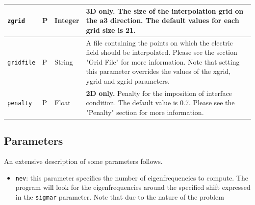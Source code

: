 \documentclass[11pt,a4paper,oneside]{article}
\begin{document}
\begin{center}
\begin{tabular}{| l | l | l | p{230pt} |}
	{\tt zgrid} & P & Integer & {\bf 3D only.} The size of the interpolation grid on the a3 direction. The default values for each grid size is 21. \\ \hline
	{\tt gridfile} & P & String & A file containing the points on which the electric field should be interpolated. Please see the section "Grid File" for more information. Note that setting this parameter overrides the values of the xgrid, ygrid and zgrid parameters. \\ \hline
	{\tt penalty} & P & Float & {\bf 2D only.} Penalty for the imposition of interface condition. The default value is 0.7. Please see the "Penalty" section for more information. \\ \hline
    \hline
  \end{tabular}
\end{center}

\newpage

\subsection{Parameters}
An extensive description of some parameters follows.
\begin{itemize}
\item {\tt nev}: this parameter specifies the number of eigenfrequencies to compute. The program will look for the eigenfrequencies around the specified shift expressed in the {\tt sigmar} parameter. Note that due to the nature of the problem
\end{itemize}
\end{document}
